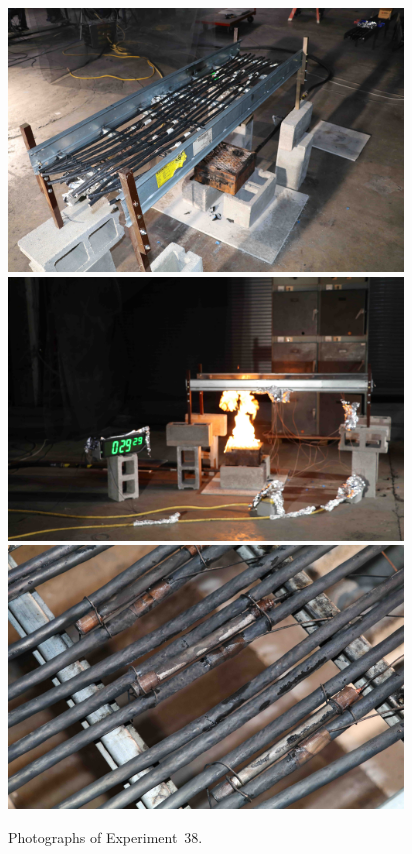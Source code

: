 \begin{figure}[p]
\centering
\includegraphics[height=2.75in]{../FIGURES/Test_38_setup} \\
\includegraphics[height=2.75in]{../FIGURES/Test_38_29_min_29_s} \\
\includegraphics[height=2.75in]{../FIGURES/Test_38_damage}
\caption[Photographs of Experiment~38]{Photographs of Experiment~38.}
\label{fig:Test_38_photos}
\end{figure}


\clearpage

